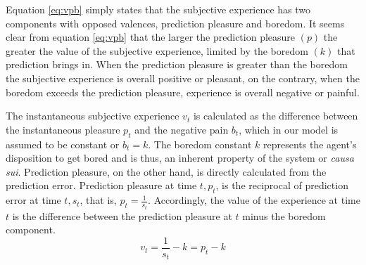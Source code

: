 \documentclass[11pt, onecolumn]{article}
\begin{document}
Equation \ref{eq:vpb} simply states that the subjective experience has two components with opposed valences, prediction pleasure and boredom. It seems clear from equation  \ref{eq:vpb} that the larger the prediction pleasure $(p)$ the greater the value of the subjective experience, limited by the boredom $(k)$ that prediction brings in.  
When the prediction pleasure is greater than the boredom the subjective experience is overall positive or pleasant, on the contrary, when the boredom exceeds the prediction pleasure, experience is overall negative or painful. 

The instantaneous subjective experience $v_t$ is calculated as the difference between the instantaneous pleasure $p_t$ and the negative pain $b_t$, which in our model is assumed to be constant or $b_t=k$. The boredom constant $k$ represents the agent's disposition to get bored and is thus, an inherent property of the system or \emph{causa sui}. Prediction pleasure, on the other hand, is directly calculated from the prediction error.
Prediction pleasure at time $t, p_t$, is the reciprocal of prediction error at time $t, s_t$, that is, $p_t = \frac{1}{s_t}$.
Accordingly, the value of the experience at time $t$ is the difference between the prediction pleasure at $t$ minus the boredom component.
\begin{equation}
    v_t = \frac{1}{s_t} -k = p_t - k
\label{eq:vpbt}
\end{equation}
\end{document}
